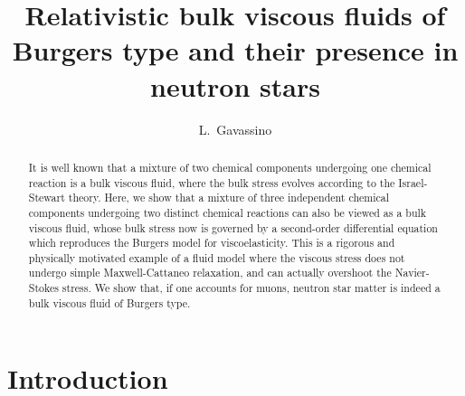 \documentclass[a4paper, amsfonts, amssymb, amsmath, reprint, showkeys, nofootinbib, twoside, onecolumn,notitlepage]{revtex4-1}
\begin{document}
\title{Relativistic bulk viscous fluids of Burgers type and their presence in neutron stars}
\author{L.~Gavassino}


\begin{abstract}
It is well known that a mixture of two chemical components undergoing one chemical reaction is a bulk viscous fluid, where the bulk stress evolves according to the Israel-Stewart theory. Here, we show that a mixture of three independent chemical components undergoing two distinct chemical reactions can also be viewed as a bulk viscous fluid, whose bulk stress now is governed by a second-order differential equation which reproduces the Burgers model for viscoelasticity. This is a rigorous and physically motivated example of a fluid model where the viscous stress does not undergo simple Maxwell-Cattaneo relaxation, and can actually overshoot the Navier-Stokes stress. We show that, if one accounts for muons,  neutron star matter is indeed a bulk viscous fluid of Burgers type.
\end{abstract} 



\maketitle




\section{Introduction} 
\end{document}
